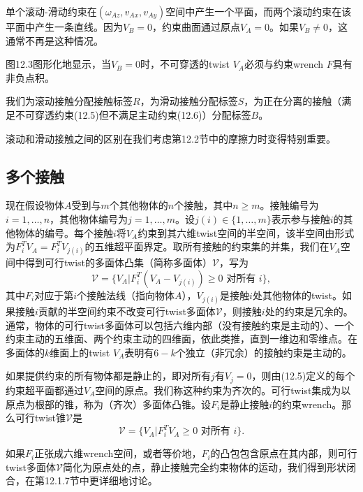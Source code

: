\documentclass[12pt,a4paper]{article}
\begin{document}
单个滚动-滑动约束在$(\omega_{Az}, v_{Ax}, v_{Ay})$空间中产生一个平面，而两个滚动约束在该平面中产生一条直线。因为$V_B = 0$，约束曲面通过原点$V_A = 0$。如果$V_B \neq 0$，这通常不再是这种情况。

图12.3图形化地显示，当$V_B = 0$时，不可穿透的twist $V_A$必须与约束wrench $F$具有非负点积。

我们为滚动接触分配接触标签$R$，为滑动接触分配标签$S$，为正在分离的接触（满足不可穿透约束(12.5)但不满足主动约束(12.6)）分配标签$B$。

滚动和滑动接触之间的区别在我们考虑第12.2节中的摩擦力时变得特别重要。

\subsection{多个接触}
\label{subsec:multiple_contacts}

现在假设物体$A$受到与$m$个其他物体的$n$个接触，其中$n \geq m$。接触编号为$i = 1, \ldots, n$，其他物体编号为$j = 1, \ldots, m$。设$j(i) \in \{1, \ldots, m\}$表示参与接触$i$的其他物体的编号。每个接触$i$将$V_A$约束到其六维twist空间的半空间，该半空间由形式为$F_i^T V_A = F_i^T V_{j(i)}$的五维超平面界定。取所有接触的约束集的并集，我们在$V_A$空间中得到可行twist的多面体凸集（简称多面体）$\mathcal{V}$，写为
\begin{equation}
\mathcal{V} = \{V_A | F_i^T (V_A - V_{j(i)}) \geq 0 \text{ 对所有 } i\},
\end{equation}
其中$F_i$对应于第$i$个接触法线（指向物体$A$），$V_{j(i)}$是接触$i$处其他物体的twist。如果接触$i$贡献的半空间约束不改变可行twist多面体$\mathcal{V}$，则接触$i$处的约束是冗余的。通常，物体的可行twist多面体可以包括六维内部（没有接触约束是主动的）、一个约束主动的五维面、两个约束主动的四维面，依此类推，直到一维边和零维点。在多面体的$k$维面上的twist $V_A$表明有$6 - k$个独立（非冗余）的接触约束是主动的。

如果提供约束的所有物体都是静止的，即对所有$j$有$V_j = 0$，则由(12.5)定义的每个约束超平面都通过$V_A$空间的原点。我们称这种约束为齐次的。可行twist集成为以原点为根部的锥，称为（齐次）多面体凸锥。设$F_i$是静止接触$i$的约束wrench。那么可行twist锥$\mathcal{V}$是
\begin{equation}
\mathcal{V} = \{V_A | F_i^T V_A \geq 0 \text{ 对所有 } i\}.
\end{equation}

如果$F_i$正张成六维wrench空间，或者等价地，$F_i$的凸包包含原点在其内部，则可行twist多面体$\mathcal{V}$简化为原点处的点，静止接触完全约束物体的运动，我们得到形状闭合，在第12.1.7节中更详细地讨论。
\end{document}
